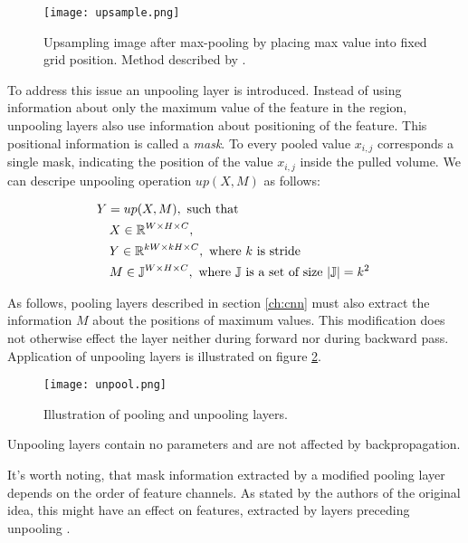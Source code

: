 \begin{figure}[h!]
  \centering
    \texttt{[image: upsample.png]}
  \caption{Upsampling image after max-pooling by placing max value into fixed grid position. Method described by \cite{Dosovitskiy2015a}.}
  \label{fig:pool}
\end{figure}

To address this issue an unpooling layer is introduced. Instead of using information about only the maximum value of the feature in the region, unpooling layers also use information about positioning of the feature. This positional information is called a \textit{mask}. To every pooled value $x_{i,j}$ corresponds a single mask, indicating the position of the value $x_{i,j}$ inside the pulled volume. We can descripe unpooling operation $up(X, M)$ as follows:

\begin{equation}\label{eq:unp}
  \begin{aligned}
    & Y = up(X, M),\text{ such that} \\
    & \quad X \in \Bbb{R}^{W \times H \times C}, \\
    & \quad Y \in \Bbb{R}^{kW \times kH \times C}, \text{ where $k$ is stride } \\
    & \quad M \in \Bbb{J}^{W \times H \times C}, \text{ where $\Bbb{J}$ is a set of size $|\Bbb{J}|=k^2$ }
  \end{aligned}
\end{equation}

As follows, pooling layers described in section \ref{ch:cnn} must also extract the information $M$ about the positions of maximum values. This modification does not otherwise effect the layer neither during forward nor during backward pass. Application of unpooling layers is illustrated on figure \ref{fig:unpool}.

\begin{figure}[h!]
  \centering
    \texttt{[image: unpool.png]}
  \caption{Illustration of pooling and unpooling layers.}
  \label{fig:unpool}
\end{figure}

Unpooling layers contain no parameters and are not affected by backpropagation.

It's worth noting, that mask information extracted by a modified pooling layer depends on the order of feature channels. As stated by the authors of the original idea, this might have an effect on features, extracted by layers preceding unpooling \cite{Zhao2015}.


